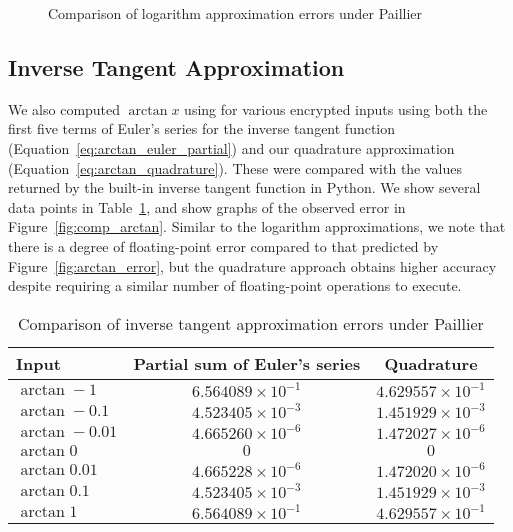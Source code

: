 \begin{figure}[!ht]
	\centering
	\caption{Comparison of logarithm approximation errors under Paillier}
	\label{fig:comp_log}
\end{figure}

\subsection{Inverse Tangent Approximation}
We also computed $\arctan x$ using for various encrypted inputs using both the first five terms of Euler's series for the inverse tangent function (Equation~\ref{eq:arctan_euler_partial}) and our quadrature approximation (Equation~\ref{eq:arctan_quadrature}). These were compared with the values returned by the built-in inverse tangent function in Python. We show several data points in Table~\ref{tab:arctan_approximation}, and show graphs of the observed error in Figure~\ref{fig:comp_arctan}. Similar to the logarithm approximations, we note that there is a degree of floating-point error compared to that predicted by Figure~\ref{fig:arctan_error}, but the quadrature approach obtains higher accuracy despite requiring a similar number of floating-point operations to execute.

\begin{table}[ht]
	\caption{Comparison of inverse tangent approximation errors under Paillier}
	\label{tab:arctan_approximation}
	\begin{tabular}{lcc}
		\toprule
		Input & Partial sum of Euler's series & Quadrature\\
		\midrule
		$\arctan -1$ & $6.564089 \times 10^{-1}$ & $4.629557 \times 10^{-1}$\\
		$\arctan -0.1$ & $4.523405 \times 10^{-3}$ & $1.451929 \times 10^{-3}$\\
		$\arctan -0.01$ & $4.665260 \times 10^{-6}$ & $1.472027 \times 10^{-6}$\\
		$\arctan 0$ & $0$ & $0$\\
		$\arctan 0.01$ & $4.665228 \times 10^{-6}$ & $1.472020 \times 10^{-6}$\\
		$\arctan 0.1$ & $4.523405 \times 10^{-3} $ & $1.451929 \times 10^{-3}$\\
		$\arctan 1$ & $6.564089 \times 10^{-1} $ & $4.629557 \times 10^{-1}$\\
	\bottomrule
\end{tabular}
\end{table}

